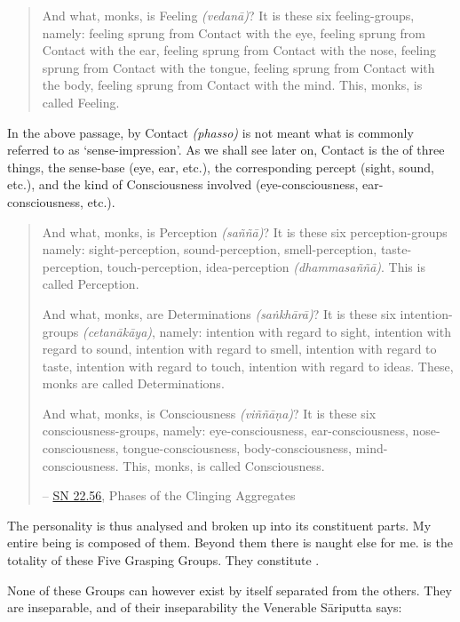 \begin{quote}
And what, monks, is Feeling \emph{(vedanā)}? It is these six feeling-groups, namely: feeling sprung from Contact with the eye, feeling sprung from Contact with the ear, feeling sprung from Contact with the nose, feeling sprung from Contact with the tongue, feeling sprung from Contact with the body, feeling sprung from Contact with the mind. This, monks, is called Feeling.
\end{quote}

In the above passage, by Contact \emph{(phasso)} is not meant what is commonly referred to as `sense-impression'. As we shall see later on, Contact is the  of three things, the sense-base (eye, ear, etc.), the corresponding percept (sight, sound, etc.), and the kind of Consciousness involved (eye-consciousness, ear-consciousness, etc.).

\clearpage

\begin{quote}
And what, monks, is Perception \emph{(saññā)}? It is these six perception-groups namely: sight-perception, sound-perception, smell-perception, taste-perception, touch-perception, idea-perception \emph{(dhammasaññā)}. This is called Perception.

And what, monks, are Determinations \emph{(saṅkhārā)}? It is these six intention-groups \emph{(cetanākāya)}, namely: intention with regard to sight, intention with regard to sound, intention with regard to smell, intention with regard to taste, intention with regard to touch, intention with regard to ideas. These, monks are called Determinations.

And what, monks, is Consciousness \emph{(viññāṇa)}? It is these six consciousness-groups, namely: eye-consciousness, ear-consciousness, nose-consciousness, tongue-consciousness, body-consciousness, mind-consciousness. This, monks, is called Consciousness.

 -- \href{https://suttacentral.net/sn22.56/en/bodhi}{SN 22.56}, Phases of the Clinging Aggregates
\end{quote}

The personality is thus analysed and broken up into its constituent parts. My entire being is composed of them. Beyond them there is naught else for me.  is the totality of these Five Grasping Groups. They constitute .

None of these Groups can however exist by itself separated from the others. They are inseparable, and of their inseparability the Venerable Sāriputta says:

